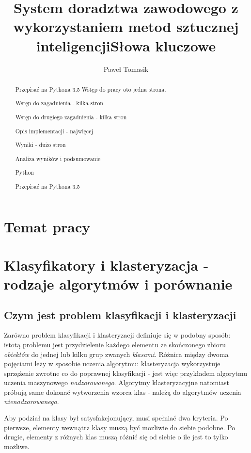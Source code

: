 \documentclass[12pt,a4paper,oneside]{report} %
\title{System doradztwa zawodowego z wykorzystaniem metod sztucznej inteligencji}
\author{Paweł Tomasik}
\begin{document}
\maketitle
\begin{abstract}
Przepisać na Pythona 3.5
Wstęp do pracy oto jedna strona.\par
Wstęp do zagadnienia - kilka stron \par
Wstęp do drugiego zagadnienia - kilka stron \par
Opis implementacji - najwięcej \par
Wyniki - dużo stron\par
Analiza wyników i podsumowanie \par
\title{Słowa kluczowe}
Python
\end{abstract}
\renewcommand{\abstractname}{Strzeszczenie}
\begin{abstract}
Przepisać na Pythona 3.5
\end{abstract}

\tableofcontents

\section{Temat pracy}

\section{Klasyfikatory i klasteryzacja - rodzaje algorytmów i porównanie}
\subsection{Czym jest problem klasyfikacji i klasteryzacji}

Zarówno problem klasyfikacji i klasteryzacji definiuje się w podobny sposób: istotą problemu jest przydzielenie każdego elementu ze skończonego zbioru \emph{obiektów} do jednej lub kilku grup zwanych \emph{klasami}. Różnica między dwoma pojęciami leży w sposobie uczenia algorytmu: klasteryzacja wykorzystuje sprzężenie zwrotne co do poprawnej klasyfikacji - jest więc przykładem algorytmu uczenia maszynowego \emph{nadzorowanego}. Algorytmy klasteryzacyjne natomiast próbują same dokonać wytworzenia wzorca klas - należą do algorytmów uczenia \emph{nienadzorowanego}.\par

Aby podział na klasy był satysfakcjonujący, musi spełniać dwa kryteria. Po pierwsze, elementy wewnątrz klasy muszą być mozliwie do siebie podobne. Po drugie, elementy z różnych klas muszą różnić się od siebie o ile jest to tylko możliwe.\par
\end{document}
